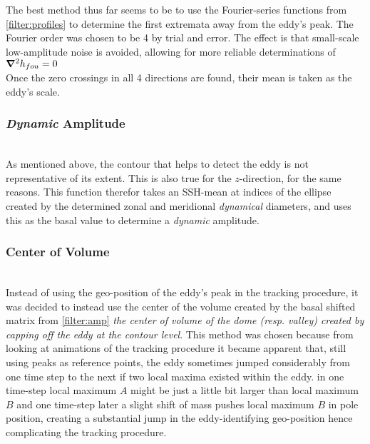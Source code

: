 The best method thus far seems to be to use the Fourier-series functions from \ref{filter:profiles} to determine the first extremata away from the eddy's peak. The Fourier order was chosen to be 4 by trial and error. The effect is that small-scale low-amplitude noise is avoided, allowing for more reliable determinations of $\mathbf{\bm{\nabla}}^2 h_{fou} = 0$       \\
 Once the zero crossings in all 4 directions are found, their mean is taken as the eddy's scale. 
\subsubsection{\textit{Dynamic} Amplitude} \label{filter:ampDyn}
\\
As mentioned above, the contour that helps to detect the eddy is not
representative of its extent. This is also true for the $z$-direction, for the
same reasons. This function therefor takes an SSH-mean at indices of the ellipse
created by the determined zonal and meridional \textit{dynamical} diameters,
and uses this as the basal value to determine a \textit{dynamic} amplitude.
\subsubsection{Center of Volume} \label{filter:CoV}
\\
Instead of using the geo-position of the eddy's peak in the tracking procedure,
it was decided to instead use the center of the volume created by the basal
shifted matrix from \ref{filter:amp} \ie \textit{the center of volume of the
dome
(resp. valley) created by capping off the eddy at the contour level}.
This method was chosen because from looking at animations of the tracking
procedure
it became apparent that, still using peaks as reference points, the eddy
sometimes jumped considerably from one time step to the next if two local maxima
existed within the eddy. \Eg in one time-step local maximum $A$ might be just a
little bit larger than local maximum $B$ and one time-step later a slight shift
of mass pushes local maximum $B$ in pole position, creating a substantial jump
in the eddy-identifying geo-position hence complicating the tracking procedure. 
